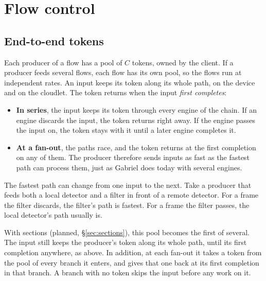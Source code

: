 \documentclass[11pt]{article}
\begin{document}
\section{Flow control}
\label{sec:flow}

\subsection{End-to-end tokens}
\label{sec:tokens}

Each producer of a flow has a pool of $C$ tokens, owned by the client. If a
producer feeds several flows, each flow has its own pool, so the flows run
at independent rates. An input keeps its token along its whole path, on the
device and on the cloudlet. The token returns when the input \emph{first
completes}:
\begin{itemize}[nosep]
  \item \textbf{In series}, the input keeps its token through every engine of
        the chain. If an engine discards the input, the token returns right
        away. If the engine passes the input on, the token stays with it until
        a later engine completes it.
  \item \textbf{At a fan-out}, the paths race, and the token returns at the
        first completion on any of them. The producer therefore sends inputs as
        fast as the fastest path can process them, just as Gabriel does today
        with several engines.
\end{itemize}
The fastest path can change from one input to the next. Take a producer that
feeds both a local detector and a filter in front of a remote detector. For a
frame the filter discards, the filter's path is fastest. For a frame the
filter passes, the local detector's path usually is.

With sections (planned, \S\ref{sec:sections}), this pool becomes the first
of several. The input still keeps the producer's token along its whole path,
until its first completion anywhere, as above. In addition, at each fan-out
it takes a token from the pool of every branch it enters, and gives that one
back at its first completion in that branch. A branch with no token skips the
input before any work on it.
\end{document}
